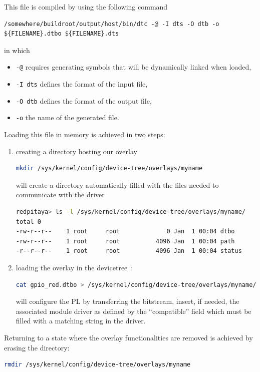 \documentclass[10pt,oneside]{article}
\begin{document}
This file is compiled by using the following command
\begin{lstlisting}
/somewhere/buildroot/output/host/bin/dtc -@ -I dts -O dtb -o ${FILENAME}.dtbo ${FILENAME}.dts
\end{lstlisting}
in which 
\begin{itemize}
\item {\tt -@} requires generating symbols that will be dynamically linked when loaded,
\item {\tt -I dts} defines the format of the input file,
\item {\tt -O dtb} defines the format of the output file,
\item {\tt -o} the name of the generated file.
\end{itemize}

Loading this file in memory is achieved in two steps:
\begin{enumerate}
\item creating a directory hosting our overlay
\begin{lstlisting}[language=bash]
mkdir /sys/kernel/config/device-tree/overlays/myname
\end{lstlisting}
will create a directory automatically filled with the files needed to
communicate with the driver
\begin{lstlisting}[language=bash]
redpitaya> ls -l /sys/kernel/config/device-tree/overlays/myname/
total 0
-rw-r--r--    1 root     root             0 Jan  1 00:04 dtbo
-rw-r--r--    1 root     root          4096 Jan  1 00:04 path
-r--r--r--    1 root     root          4096 Jan  1 00:04 status
\end{lstlisting}
\item
loading the overlay in the {devicetree}~:
\begin{lstlisting}[language=bash]
cat gpio_red.dtbo > /sys/kernel/config/device-tree/overlays/myname/dtbo
\end{lstlisting}
will configure the PL by transferring the bitstream, insert, if needed, the associated module driver
as defined by the ``compatible'' field which must be filled with a matching string in
the driver.
\end{enumerate}

Returning to a state where the overlay functionalities are removed is achieved by
erasing the directory:
\begin{lstlisting}[language=bash]
rmdir /sys/kernel/config/device-tree/overlays/myname
\end{lstlisting}
\end{document}
